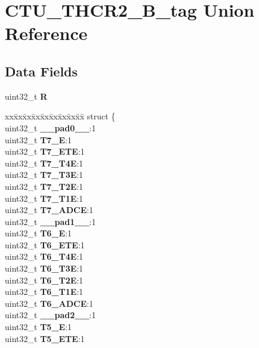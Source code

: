 \hypertarget{unionCTU__THCR2__32B__tag}{}\section{C\+T\+U\+\_\+\+T\+H\+C\+R2\+\_\+B\+\_\+tag Union Reference}
\label{unionCTU__THCR2__32B__tag}
\subsection*{Data Fields}
\begin{DoxyCompactItemize}
\item 
\mbox{\label{unionCTU__THCR2__32B__tag_a96aa7ad82161373a571cbc1c8bd334a5}} 
uint32\+\_\+t {\bfseries R}
\item 
\mbox{\label{unionCTU__THCR2__32B__tag_ae7519377b0a8ccb29a76fdd499894294}} 
\begin{tabbing}
xx\=xx\=xx\=xx\=xx\=xx\=xx\=xx\=xx\=\kill
struct \{\\
\>uint32\_t {\bfseries \_\_pad0\_\_}:1\\
\>uint32\_t {\bfseries T7\_E}:1\\
\>uint32\_t {\bfseries T7\_ETE}:1\\
\>uint32\_t {\bfseries T7\_T4E}:1\\
\>uint32\_t {\bfseries T7\_T3E}:1\\
\>uint32\_t {\bfseries T7\_T2E}:1\\
\>uint32\_t {\bfseries T7\_T1E}:1\\
\>uint32\_t {\bfseries T7\_ADCE}:1\\
\>uint32\_t {\bfseries \_\_pad1\_\_}:1\\
\>uint32\_t {\bfseries T6\_E}:1\\
\>uint32\_t {\bfseries T6\_ETE}:1\\
\>uint32\_t {\bfseries T6\_T4E}:1\\
\>uint32\_t {\bfseries T6\_T3E}:1\\
\>uint32\_t {\bfseries T6\_T2E}:1\\
\>uint32\_t {\bfseries T6\_T1E}:1\\
\>uint32\_t {\bfseries T6\_ADCE}:1\\
\>uint32\_t {\bfseries \_\_pad2\_\_}:1\\
\>uint32\_t {\bfseries T5\_E}:1\\
\>uint32\_t {\bfseries T5\_ETE}:1\\

\end{tabbing}
\end{DoxyCompactItemize}
